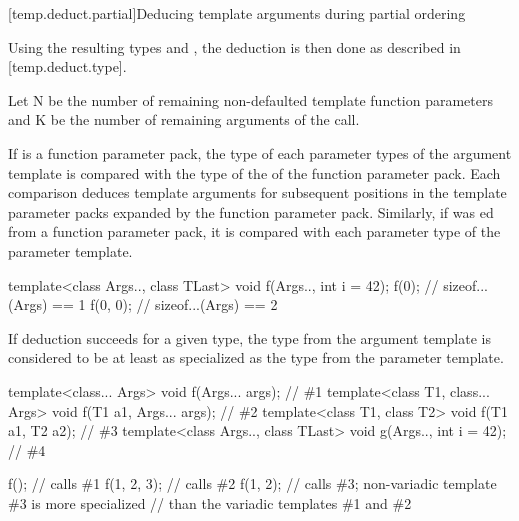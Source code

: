 \documentclass{wg21}
\begin{document}
[temp.deduct.partial]{Deducing template arguments during partial ordering}

\pnum
Using the resulting types
and
,
the deduction is then done as described in [temp.deduct.type].

\begin{addedblock}
Let N be the number of remaining non-defaulted template function parameters and K be the number of remaining arguments of the call.
\end{addedblock}

If  is a function parameter pack,
the type  of each 
parameter types of the argument template is compared with the type  of
the  of the function parameter pack. Each comparison
deduces template arguments for subsequent positions in the template parameter
packs expanded by the function parameter pack.
Similarly, if  was ed from a function parameter pack,
it is compared with each   parameter type of the parameter template.
\begin{addedblock}
\begin{example}
\begin{codeblock}
template<class Args.., class TLast> void f(Args.., int i = 42);
f(0); // sizeof...(Args) == 1
f(0, 0); // sizeof...(Args) == 2
\end{codeblock}
\end{example}
\end{addedblock}


If deduction succeeds for a given type,
the type from the argument template is considered to be at least as specialized
as the type from the parameter template.
\begin{example}
    \begin{codeblock}
        template<class... Args>              void f(Args... args);        // \#1
        template<class T1, class... Args>    void f(T1 a1, Args... args); // \#2
        template<class T1, class T2>         void f(T1 a1, T2 a2);        // \#3
        template<class Args.., class TLast>  void g(Args.., int i = 42); //  \#4

        f();                // calls \#1
        f(1, 2, 3);         // calls \#2
        f(1, 2);            // calls \#3; non-variadic template \#3 is more specialized
        // than the variadic templates \#1 and \#2
    \end{codeblock}
\end{example}
\end{document}

